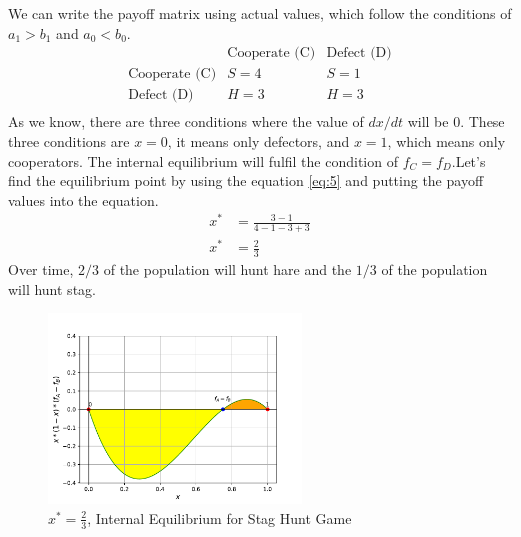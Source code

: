 \documentclass{article}
\begin{document}
We can write the payoff matrix using actual values, which follow the conditions of $a_1>b_1$ and $a_0<b_0$.
\[
\begin{array}{c|cc}
   & \text{Cooperate (C)} & \text{Defect (D)} \\
  \hline
  \text{Cooperate (C)} & S = 4 & S = 1 \\
  \text{Defect (D)} & H = 3 & H = 3 \\
\end{array}
\]
As we know, there are three conditions where the value of $dx/dt$ will be $0$. These three conditions are $x=0$, it means only defectors, and $x=1$, which means only cooperators. The internal equilibrium will fulfil the condition of $f_C=f_D$.Let's find the equilibrium point by using the equation \eqref{eq:5} and putting the payoff values into the equation.\\
\begin{align}
x^* &=\frac{3-1}{4-1-3+3} \nonumber\\
x^* &= \frac{2}{3} \nonumber
\end{align}
Over time, $2/3$ of the population will hunt hare and the $1/3$ of the population will hunt stag.
\begin{figure}[H]
    \centering
    \includegraphics[width=0.6\textwidth]{SH.pdf}
    \caption{$x^*=\frac{2}{3}$, Internal Equilibrium for Stag Hunt Game}
    \label{fig:3}
\end{figure}
\end{document}
